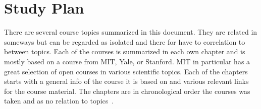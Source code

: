 \documentclass{book}
\author{Anton Augustsson}
\begin{document}
\maketitle
\newpage
\tableofcontents
\newpage



\chapter{Study Plan}
There are several course topics summarized in this document.
They are related in someways but can be regarded as isolated and there for have to correlation to between topics.
Each of the courses is summarized in each own chapter and is mostly based on a course from MIT, Yale, or Stanford.
MIT in particular has a great selection of open courses in various scientific topics. Each of the chapters starts
with a general info of the course it is based on and various relevant links for the course material.
The chapters are in chronological order the courses was taken and as no relation to topics~\cite{2014/35/EU}.
\newpage


\newcommand{\pathMATH}{chapters}

\newcommand{\pathFM}{\pathMATH/Fundamental-Mathematics}  \newpage
\newcommand{\pathDE}{\pathMATH/Differential-Equations}  \newpage
\newcommand{\pathAA}{\pathMATH/Abstract-Algebra}  \newpage
\newcommand{\pathT}{\pathMATH/Topology}  \newpage

 

\newpage
\printbibliography
\end{document}
